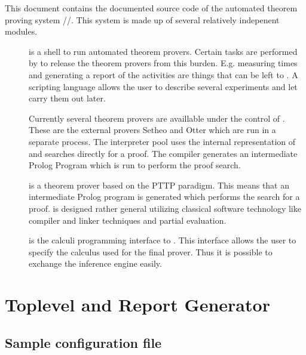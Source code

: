 This document contains the documented source code of the automated theorem
proving system \ProTop/\ProCom/\CaPrI. This system is made up of several
relatively indepenent modules.
\begin{description}
\item[\ProTop] 
  is a shell to run automated theorem provers. Certain tasks are performed by
  \ProTop{} to release the theorem provers from this burden. E.g. measuring
  times and generating a report of the activities are things that can be left
  to \ProTop. A scripting language allows the user to describe several
  experiments and let \ProTop{} carry them out later.

  Currently several theorem provers are availlable under the control of
  \ProTop. These are the external provers Setheo and Otter which are run in a
  separate process. The interpreter pool uses the internal representation of
  \ProTop{} and searches directly for a proof. The compiler \ProCom{}
  generates an intermediate Prolog Program which is run to perform the proof
  search.

\item[\ProCom]
  is a theorem prover based on the PTTP paradigm. This means that an
  intermediate Prolog program is generated which performs the search for a
  proof. \ProCom{} is designed rather general utilizing classical software
  technology like compiler and linker techniques and partial evaluation.
  
\item[\CaPrI]
  is the calculi programming interface to \ProCom. This interface allows the
  user to specify the calculus used for the final prover. Thus it is possible
  to exchange the inference engine easily.
  
\end{description}


\chapter{Toplevel and Report Generator}

\section{Sample configuration file}%

